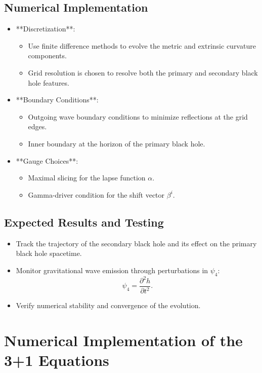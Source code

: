 \documentclass[12pt]{article}
\begin{document}
\subsection{Numerical Implementation}
\begin{itemize}
    \item **Discretization**:
    \begin{itemize}
        \item Use finite difference methods to evolve the metric and extrinsic curvature components.
        \item Grid resolution is chosen to resolve both the primary and secondary black hole features.
    \end{itemize}
    \item **Boundary Conditions**:
    \begin{itemize}
        \item Outgoing wave boundary conditions to minimize reflections at the grid edges.
        \item Inner boundary at the horizon of the primary black hole.
    \end{itemize}
    \item **Gauge Choices**:
    \begin{itemize}
        \item Maximal slicing for the lapse function $\alpha$.
        \item Gamma-driver condition for the shift vector $\beta^i$.
    \end{itemize}
\end{itemize}

\subsection{Expected Results and Testing}
\begin{itemize}
    \item Track the trajectory of the secondary black hole and its effect on the primary black hole spacetime.
    \item Monitor gravitational wave emission through perturbations in $\psi_4$:
    \[
    \psi_4 = \frac{\partial^2 h}{\partial t^2}.
    \]
    \item Verify numerical stability and convergence of the evolution.
\end{itemize}

\section{Numerical Implementation of the 3+1 Equations}
\end{document}
